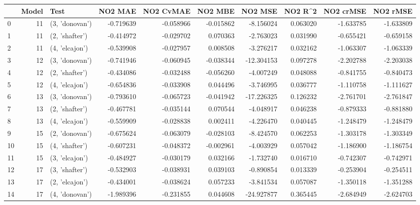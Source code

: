 \begin{tabular}{lrlrrrrrrr}
\toprule
{} &  Model &            Test &   NO2 MAE &  NO2 CvMAE &   NO2 MBE &    NO2 MSE &   NO2 R\textasciicircum2 &  NO2 crMSE &  NO2 rMSE \\
\midrule
0  &     11 &  (3, 'donovan') & -0.719639 &  -0.058966 & -0.015862 &  -8.156024 &  0.063020 &  -1.633785 & -1.633809 \\
1  &     11 &  (2, 'shafter') & -0.414972 &  -0.029702 &  0.070363 &  -2.763023 &  0.031990 &  -0.655421 & -0.659158 \\
2  &     11 &  (4, 'elcajon') & -0.539908 &  -0.027957 &  0.008508 &  -3.276217 &  0.032162 &  -1.063307 & -1.063339 \\
3  &     12 &  (3, 'donovan') & -0.741946 &  -0.060945 & -0.038344 & -12.304153 &  0.097278 &  -2.202788 & -2.203038 \\
4  &     12 &  (2, 'shafter') & -0.434086 &  -0.032488 & -0.056260 &  -4.007249 &  0.048088 &  -0.841755 & -0.840473 \\
5  &     12 &  (4, 'elcajon') & -0.654836 &  -0.033908 &  0.044496 &  -3.746995 &  0.036777 &  -1.110758 & -1.111627 \\
6  &     13 &  (3, 'donovan') & -0.793610 &  -0.065723 & -0.041942 & -17.226325 &  0.126232 &  -2.761701 & -2.761847 \\
7  &     13 &  (2, 'shafter') & -0.467781 &  -0.035144 &  0.070544 &  -4.048917 &  0.046238 &  -0.879333 & -0.881880 \\
8  &     13 &  (4, 'elcajon') & -0.559909 &  -0.028838 &  0.002411 &  -4.226470 &  0.040445 &  -1.248479 & -1.248479 \\
9  &     15 &  (2, 'donovan') & -0.675624 &  -0.063079 & -0.028103 &  -8.424570 &  0.062253 &  -1.303178 & -1.303349 \\
10 &     15 &  (4, 'shafter') & -0.607231 &  -0.048372 & -0.002961 &  -4.003929 &  0.057042 &  -1.186900 & -1.186754 \\
11 &     15 &  (3, 'elcajon') & -0.484927 &  -0.030179 &  0.032166 &  -1.732740 &  0.016710 &  -0.742307 & -0.742971 \\
12 &     17 &  (3, 'shafter') & -0.532903 &  -0.038931 &  0.039103 &  -0.890854 &  0.013339 &  -0.253904 & -0.254511 \\
13 &     17 &  (2, 'elcajon') & -0.434001 &  -0.038624 &  0.057233 &  -3.841534 &  0.057087 &  -1.350118 & -1.351288 \\
14 &     17 &  (4, 'donovan') & -1.989396 &  -0.231855 &  0.044608 & -24.927877 &  0.365445 &  -2.684949 & -2.624703 \\

\end{tabular}
